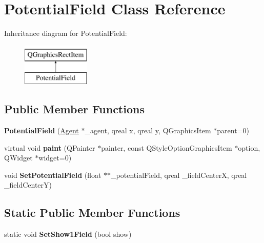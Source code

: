 \hypertarget{class_potential_field}{\section{Potential\-Field Class Reference}
\label{class_potential_field}
}
Inheritance diagram for Potential\-Field\-:\begin{figure}[H]
\begin{center}
\leavevmode
\includegraphics[height=2.000000cm]{class_potential_field}
\end{center}
\end{figure}
\subsection*{Public Member Functions}
\begin{DoxyCompactItemize}
\item 
\hypertarget{class_potential_field_a7b2385c9859061a9fc62f6505f02db52}{{\bfseries Potential\-Field} (\hyperlink{class_agent}{Agent} $\ast$\-\_\-agent, qreal x, qreal y, Q\-Graphics\-Item $\ast$parent=0)}\label{class_potential_field_a7b2385c9859061a9fc62f6505f02db52}

\item 
\hypertarget{class_potential_field_a1fe7dc0a44a503749d1bf800a8daf551}{virtual void {\bfseries paint} (Q\-Painter $\ast$painter, const Q\-Style\-Option\-Graphics\-Item $\ast$option, Q\-Widget $\ast$widget=0)}\label{class_potential_field_a1fe7dc0a44a503749d1bf800a8daf551}

\item 
\hypertarget{class_potential_field_a59152c6e41def1c6623ba28999939cc7}{void {\bfseries Set\-Potential\-Field} (float $\ast$$\ast$\-\_\-potential\-Field, qreal \-\_\-field\-Center\-X, qreal \-\_\-field\-Center\-Y)}\label{class_potential_field_a59152c6e41def1c6623ba28999939cc7}

\end{DoxyCompactItemize}
\subsection*{Static Public Member Functions}
\begin{DoxyCompactItemize}
\item 
\hypertarget{class_potential_field_ab58c950be66b00b911f1cc8cb88f1ceb}{static void {\bfseries Set\-Show1\-Field} (bool show)}\label{class_potential_field_ab58c950be66b00b911f1cc8cb88f1ceb}

\end{DoxyCompactItemize}
